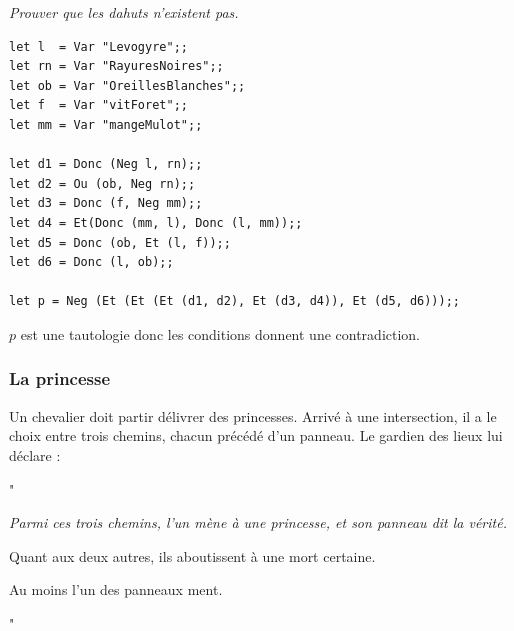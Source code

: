 \bigskip
\begin{Exercise}\it Prouver que les dahuts n'existent pas.
\end{Exercise}
\begin{Answer} 
\begin{lstlisting}
let l  = Var "Levogyre";;
let rn = Var "RayuresNoires";;
let ob = Var "OreillesBlanches";;
let f  = Var "vitForet";;
let mm = Var "mangeMulot";;

let d1 = Donc (Neg l, rn);;
let d2 = Ou (ob, Neg rn);;
let d3 = Donc (f, Neg mm);;
let d4 = Et(Donc (mm, l), Donc (l, mm));;
let d5 = Donc (ob, Et (l, f));;
let d6 = Donc (l, ob);;

let p = Neg (Et (Et (Et (d1, d2), Et (d3, d4)), Et (d5, d6)));;
\end{lstlisting}
$p$ est une tautologie donc les conditions donnent une contradiction.
\end{Answer}
\subsubsection{La princesse}
Un chevalier doit partir délivrer des princesses. Arrivé à une intersection, il a le choix entre trois chemins, chacun précédé d'un panneau. Le gardien des lieux lui déclare : 

"{\it Parmi ces trois chemins, l'un mène à une princesse, et son panneau dit la vérité. 

Quant aux deux autres, ils aboutissent à une mort certaine. 

Au moins l'un des panneaux ment.}"


